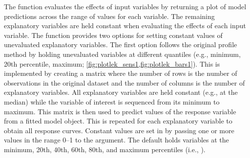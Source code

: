 \documentclass[article]{jss}
\begin{document}
The  function evaluates the effects of input
variables by returning a plot of model predictions across the range of
values for each variable.  The remaining explanatory variables are
held constant when evaluating the effects of each input variable.  The
 function provides two options for setting constant
values of unevaluated explanatory variables.  The first option follows
the original profile method by holding unevaluated variables at
different quantiles (e.g., minimum, 20th percentile, maximum;
\cref{fig:plotlek_sens1,fig:plotlek_bars1}). This is implemented by
creating a matrix where the number of rows is the number of
observations in the original dataset and the number of columns is the
number of explanatory variables. All explanatory variables are held
constant (e.g., at the median) while the variable of interest is
sequenced from its minimum to maximum. This matrix is then used to
predict values of the response variable from a fitted model
object. This is repeated for each explanatory variable to obtain all
response curves.  Constant values are set in  by
passing one or more values in the range 0--1 to the 
argument.  The default holds variables at the minimum, 20th, 40th,
60th, 80th, and maximum percentiles (i.e., ).
\end{document}
